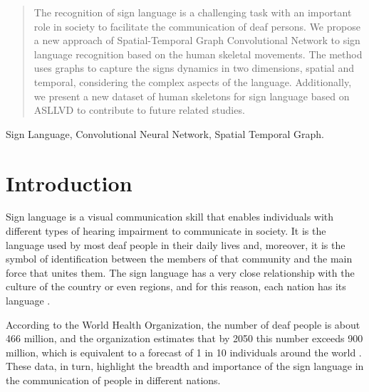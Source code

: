


\maketitle

\begin{abstract}
The recognition of sign language is a challenging task with an important role in society to facilitate the communication of deaf persons. We propose a new approach of Spatial-Temporal Graph Convolutional Network to sign language recognition based on the human skeletal movements. The method uses graphs to capture the signs dynamics in two dimensions, spatial and temporal, considering the complex aspects of the language. Additionally, we present a new dataset of human skeletons for sign language based on ASLLVD to contribute to future related studies. 
\end{abstract}

\begin{IEEEkeywords}
Sign Language, Convolutional Neural Network, Spatial Temporal Graph.
\end{IEEEkeywords}


\section{Introduction} 
\label{sec:introduction}

Sign language is a visual communication skill that enables individuals with different types of hearing impairment to communicate in society. It is the language used by most deaf people in their daily lives and, moreover, it is the symbol of identification between the members of that community and the main force that unites them.  The sign language has a very close relationship with the culture of the country or even regions, and for this reason, each nation has its language  \cite{pereira-choi-2011}.

According to the World Health Organization, the number of deaf people is about 466 million, and the organization estimates that by 2050 this number exceeds 900 million, which is equivalent to a forecast of 1 in 10 individuals around the world \cite{who-2018}. These data, in turn, highlight the breadth and importance of the sign language in the communication of people in different nations.

